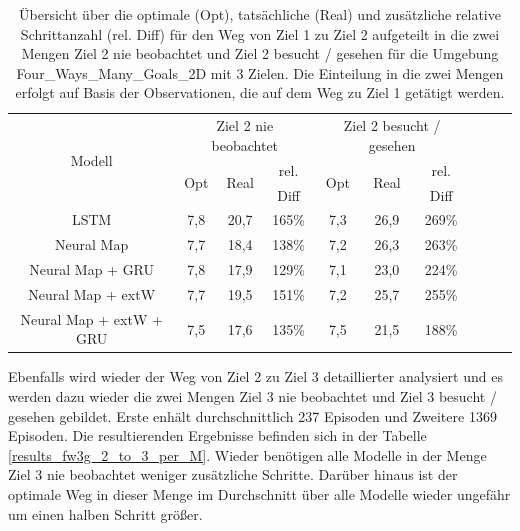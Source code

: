 \begin{table}
  \begin{tabular}{|c|c|c|c|c|c|c|c|c|c|}
    \hline
    \multirow{3}{*}{Modell} & \multicolumn{3}{|c|}{Ziel 2 nie beobachtet} & \multicolumn{3}{|c|}{Ziel 2 besucht / gesehen} \\ \cline{2-7}
    & \multirow{2}{*}{Opt} & \multirow{2}{*}{Real} & rel. & \multirow{2}{*}{Opt} & \multirow{2}{*}{Real} & rel. \\
    & & & Diff & & & Diff \\ \hline
    LSTM & 7,8 & 20,7 & 165\% & 7,3 & 26,9 & 269\% \\ \hline
    Neural Map & 7,7 & 18,4 & 138\% & 7,2 & 26,3 & 263\% \\ \hline
    Neural Map + GRU & 7,8 & 17,9 & 129\% & 7,1 & 23,0 & 224\% \\ \hline
    Neural Map + extW & 7,7 & 19,5 & 151\% & 7,2 & 25,7 & 255\% \\ \hline
    Neural Map + extW + GRU & 7,5 & 17,6 & 135\% & 7,5 & 21,5 & 188\% \\ \hline
  \end{tabular}
  \caption{Übersicht über die optimale (Opt), tatsächliche (Real) und zusätzliche relative Schrittanzahl (rel. Diff) für den Weg von Ziel 1 zu Ziel 2 aufgeteilt in die zwei Mengen \glqq Ziel 2 nie beobachtet\grqq{} und \glqq Ziel 2 besucht / gesehen\grqq{} für die Umgebung \glqq Four\_Ways\_Many\_Goals\_2D\grqq{} mit 3 Zielen. Die Einteilung in die zwei Mengen erfolgt auf Basis der Observationen, die auf dem Weg zu Ziel 1 getätigt werden.}
  \label{results_fw3g_1_to_2_per_M}
\end{table}

Ebenfalls wird wieder der Weg von Ziel 2 zu Ziel 3 detaillierter analysiert und es werden dazu wieder die zwei Mengen \glqq Ziel 3 nie beobachtet\grqq{} und \glqq Ziel 3 besucht / gesehen\grqq{} gebildet. Erste enhält durchschnittlich 237 Episoden und Zweitere 1369 Episoden. Die resultierenden Ergebnisse befinden sich in der Tabelle \ref{results_fw3g_2_to_3_per_M}. Wieder benötigen alle Modelle in der Menge \glqq Ziel 3 nie beobachtet\grqq{} weniger zusätzliche Schritte. Darüber hinaus ist der optimale Weg in dieser Menge im Durchschnitt über alle Modelle wieder ungefähr um einen halben Schritt größer.

